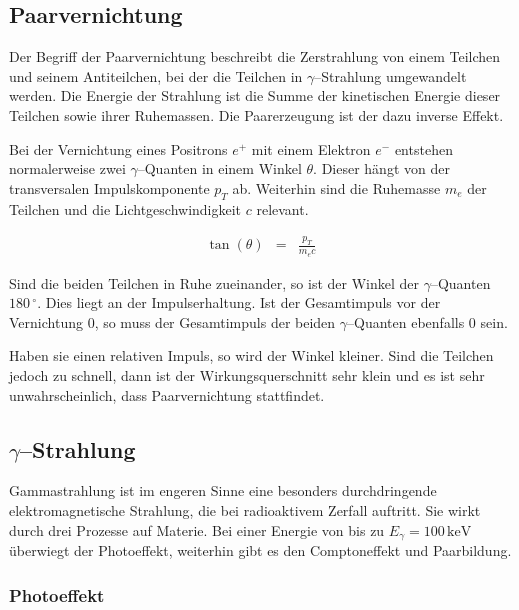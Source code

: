 \documentclass[12pt,a4paper]{scrartcl}
\numberwithin{equation}{section} %
\newcommand{\pu}[1]{\ensuremath{\mathrm{#1}}}
\begin{document}
\hypertarget{paarvernichtung}{%
\subsection{Paarvernichtung}\label{paarvernichtung}}

Der Begriff der Paarvernichtung beschreibt die Zerstrahlung von einem Teilchen und seinem Antiteilchen, bei der die Teilchen in $\gamma$--Strahlung umgewandelt werden. Die Energie der Strahlung ist die Summe der kinetischen Energie dieser Teilchen sowie ihrer Ruhemassen. Die Paarerzeugung ist der dazu inverse Effekt. \cite{Paarvernichtung}

Bei der Vernichtung eines Positrons $e^+$ mit einem Elektron $e^-$ entstehen normalerweise zwei $\gamma$--Quanten in einem Winkel $\theta$. Dieser hängt von der transversalen Impulskomponente $p_T$ ab. Weiterhin sind die Ruhemasse $m_e$ der Teilchen und die Lichtgeschwindigkeit $c$ relevant. \cite{Bethge,Annihilation}

\begin{eqnarray}
    \tan(\theta) &=& \frac{p_T}{m_ec}
\end{eqnarray}

\noindent
Sind die beiden Teilchen in Ruhe zueinander, so ist der Winkel der $\gamma$--Quanten $\pu{180\,^\circ}$. Dies liegt an der Impulserhaltung. Ist der Gesamtimpuls vor der Vernichtung $0$, so muss der Gesamtimpuls der beiden $\gamma$--Quanten ebenfalls $0$ sein.

Haben sie einen relativen Impuls, so wird der Winkel kleiner. Sind die Teilchen jedoch zu schnell, dann ist der Wirkungsquerschnitt sehr klein und es ist sehr unwahrscheinlich, dass Paarvernichtung stattfindet.

\hypertarget{gammastrahlung}{%
\subsection{\texorpdfstring{$\gamma$--Strahlung}{\textbackslash gamma--Strahlung}}\label{gammastrahlung}}

Gammastrahlung ist im engeren Sinne eine besonders durchdringende elektromagnetische Strahlung, die bei radioaktivem Zerfall auftritt. Sie wirkt durch drei Prozesse auf Materie. Bei einer Energie von bis zu $E_\gamma = \pu{100\, keV}$ überwiegt der Photoeffekt, weiterhin gibt es den Comptoneffekt und Paarbildung.

\hypertarget{photoeffekt}{%
\subsubsection{Photoeffekt}\label{photoeffekt}}
\end{document}
